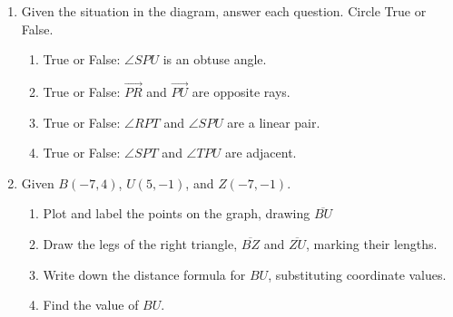 \documentclass[12pt, oneside]{article}
\begin{document}
\begin{enumerate}
\newpage
  \item Given the situation in the diagram, answer each question. Circle True or False. %
      \begin{flushright}
      \end{flushright}
    \begin{enumerate}
      \item True or False: $\angle SPU$ is an obtuse angle.
      \item True or False: $\overrightarrow{PR}$ and $\overrightarrow{PU}$ are opposite rays.
      \item True or False: $\angle RPT$ and $\angle SPU$ are a linear pair.
      \item True or False: $\angle SPT$ and $\angle TPU$ are adjacent.
    \end{enumerate}

  \item Given $B(-7, 4)$, $U(5, -1)$, and $Z(-7, -1)$.
  \begin{enumerate}
    \item Plot and label the points on the graph, drawing $\overline{BU}$
    \item Draw the legs of the right triangle, $\overline{BZ}$ and $\overline{ZU}$, marking their lengths.
    \item Write down the distance formula for $BU$, substituting coordinate values.
    \item Find the value of $BU$.
  \end{enumerate}


\end{enumerate}
\end{document}
